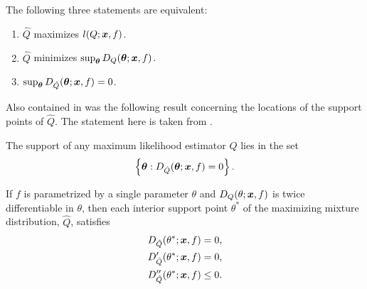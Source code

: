 	\begin{theorem}
	\label{thm:Lindsay three statements that characterise maximizing mixture}
		The following three statements are equivalent:
		\begin{enumerate}
			\item $\hat{Q}$ maximizes $l(Q;{\bm{{x}}},f)$.
			\item $\hat{Q}$ minimizes $\sup_{\bm{{\theta}}} D_Q({\bm{{\theta}}};{\bm{{x}}}, f)$.
			\item $\sup_{\bm{{\theta}}} D_{\hat{Q}}({\bm{{\theta}}};{\bm{{x}}}, f) = 0$.
			\label{item:supremum of gradient is zero}
		\end{enumerate}
	\end{theorem}

	Also contained in \cite[Theorem 4.1]{Lindsay1983-tf} was the following result concerning the locations of the support points of $\hat{Q}$. The statement here is taken from \cite[Theorem 20]{Lindsay1995-sq}.

	\begin{theorem}
		\label{thm: Lindsay support is zeros of gradient}
		The support of any maximum likelihood estimator $\hat{Q}$ lies in the set 
		\begin{equation}
			\left\{{\bm{{\theta}}} : D_{\hat{Q}}({\bm{{\theta}}};{\bm{{x}}},f) = 0 \right\}.
		\end{equation}
	\end{theorem}

	If $f$ is parametrized by a single parameter $\theta$ and $D_Q(\theta;{\bm{{x}}},f)$ is twice differentiable in $\theta$, then each interior support point $\theta^*$ of the maximizing mixture distribution, $\hat{Q}$, satisfies
	\begin{align}
		D_{\hat{Q}}(\theta^*;{\bm{{x}}}, f) &= 0, 
		\label{eq:Deq1}\\
		D'_{\hat{Q}}(\theta^*;{\bm{{x}}}, f) &= 0, 
		\label{eq:Deq2}\\
		D''_{\hat{Q}}(\theta^*;{\bm{{x}}}, f) &\leq 0.
		\label{eq:Deq3}
	\end{align}

